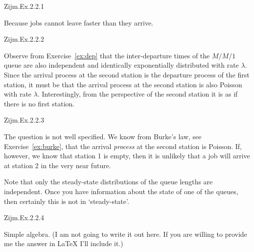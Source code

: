 \begin{exercise}[\faFlask]
Zijm.Ex.2.2.1
\begin{solution}
Because jobs cannot leave faster than they arrive.
\end{solution}
\end{exercise}

\begin{exercise}[\faFlask]
Zijm.Ex.2.2.2
\begin{solution}
  Observe from Exercise~\ref{ex:dep} that the inter-departure times of the $M/M/1$ queue are also independent and identically exponentially distributed with rate $\lambda$.
  Since the arrival process at the second station is the departure process of the first station, it must be that the arrival process at the second station is also Poisson with rate $\lambda$.
  Interestingly, from the perspective of the second station it is as if there is no first station.
\end{solution}
\end{exercise}



\begin{exercise}[\faFlask]
Zijm.Ex.2.2.3 
\begin{solution}
  The question is not well specified. We know from Burke's law, see Exercise~\ref{ex:burke}, that
  the arrival \emph{process} at the second station is Poisson.  If,
  however, we know that station 1 is empty, then it is unlikely that a
  job will arrive at station 2 in the very near future.

  Note that only the steady-state distributions of the queue lengths
  are independent. Once you have information about the state of one of
  the queues, then certainly this is not in `steady-state'.
\end{solution}
\end{exercise}

\begin{exercise}[\faFlask]
Zijm.Ex.2.2.4
\begin{solution}
  Simple algebra.  (I am not going to write it out here. If you are
  willing to provide me the answer in \LaTeX\/ I'll include it.)
\end{solution}
\end{exercise}

